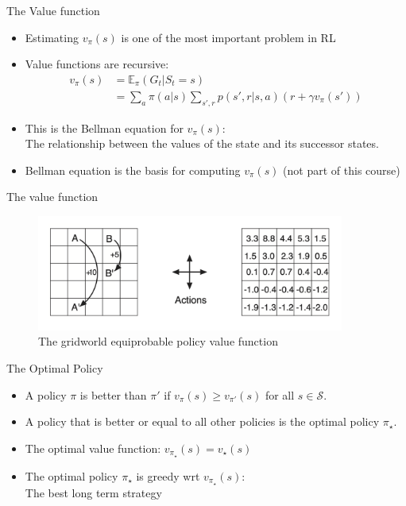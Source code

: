 \documentclass[10pt]{beamer}
\begin{document}
\begin{frame}{The Value function}

\begin{itemize}
\item Estimating $v_{\pi}(s)$ is one of the most important problem in RL\pause
\item Value functions are {\color{uured}recursive}:
\begin{align*}
       v_{\pi}(s) & = \mathbb{E}_\pi(G_t|S_t = s)      \\
                  & = \sum_a \pi(a|s) \sum_{s',r} p(s', r|s,a) (r + \gamma v_{\pi}(s'))
\end{align*}
\item This is the {\color{uured}Bellman equation} for $v_\pi(s)$: \\The relationship between the values of the state and its successor states.\pause
\item Bellman equation is the basis for computing $v_\pi(s)$ (not part of this course)

\end{itemize}

\end{frame}



\begin{frame}{The value function}

\begin{figure}[h]
\centering
\includegraphics[width=0.9\textwidth]{fig/sutton_fig_3_5.png}
\caption{The gridworld equiprobable policy value function}
\end{figure}

\end{frame}

\begin{frame}{The Optimal Policy}

\begin{itemize}
\item A policy $\pi$ is {\color{uured}better} than $\pi'$ if $v_\pi(s) \geq v_{\pi'}(s)$ for all $s \in \mathcal{S}$.\pause
\item A policy that is better or equal to all other policies is the {\color{uured}optimal policy} $\pi_\star$.\pause
\item The optimal value function: $v_{\pi_\star}(s) = v_\star(s)$\pause
\item The optimal policy $\pi_\star$ is greedy wrt $v_{\pi_\star}(s)$: \\The best long term strategy
\end{itemize}

\end{frame}
\end{document}
